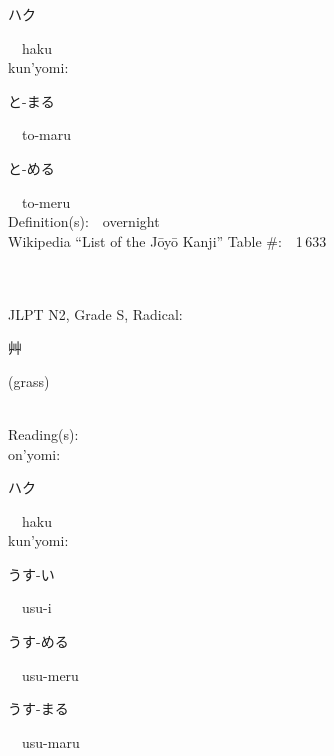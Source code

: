 \begin{multicols}{2}
{\hspace*{2em}}{\begin{CJK}{UTF8}{min} ハク \end{CJK}}\ \ haku\ \ \\
{\hspace*{1em}}kun'yomi:\ \ \\
{\hspace*{2em}}{\begin{CJK}{UTF8}{min} と-まる \end{CJK}}\ \ to-maru\ \ \\
{\hspace*{2em}}{\begin{CJK}{UTF8}{min} と-める \end{CJK}}\ \ to-meru\ \ \\
Definition(s):\ \ overnight \\
Wikipedia ``List of the J\=oy\=o Kanji'' Table \#:\ \ 1\,633 \\
\ \ \\
{\fontsize{34pt}{40pt}  }\ \ \\  %
{JLPT N2, Grade S, Radical:\ \ {\begin{CJK}{UTF8}{min} 艸 \end{CJK}} (grass) } \\
Reading(s):\ \ \\
{\hspace*{1em}}on'yomi:\ \ \\
{\hspace*{2em}}{\begin{CJK}{UTF8}{min} ハク \end{CJK}}\ \ haku\ \ \\
{\hspace*{1em}}kun'yomi:\ \ \\
{\hspace*{2em}}{\begin{CJK}{UTF8}{min} うす-い \end{CJK}}\ \ usu-i\ \ \\
{\hspace*{2em}}{\begin{CJK}{UTF8}{min} うす-める \end{CJK}}\ \ usu-meru\ \ \\
{\hspace*{2em}}{\begin{CJK}{UTF8}{min} うす-まる \end{CJK}}\ \ usu-maru\ \ \\

\end{multicols}
